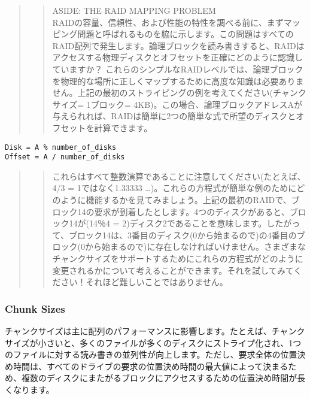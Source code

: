 \begin{quote}
\begin{quote}
ASIDE: THE RAID MAPPING PROBLEM\\
RAIDの容量、信頼性、および性能の特性を調べる前に、まずマッピング問題と呼ばれるものを脇に示します。この問題はすべてのRAID配列で発生します。論理ブロックを読み書きすると、RAIDはアクセスする物理ディスクとオフセットを正確にどのように認識していますか？
これらのシンプルなRAIDレベルでは、論理ブロックを物理的な場所に正しくマップするために高度な知識は必要ありません。上記の最初のストライピングの例を考えてください(チャンクサイズ=
1ブロック=
4KB)。この場合、論理ブロックアドレスAが与えられれば、RAIDは簡単に2つの簡単な式で所望のディスクとオフセットを計算できます。
\end{quote}
\end{quote}

\begin{verbatim}
Disk = A % number_of_disks
Offset = A / number_of_disks
\end{verbatim}

\begin{quote}
\begin{quote}
これらはすべて整数演算であることに注意してください(たとえば、4/3 =
1ではなく1.33333
\ldots)。これらの方程式が簡単な例のためにどのように機能するかを見てみましょう。上記の最初のRAIDで、ブロック14の要求が到着したとします。4つのディスクがあると、ブロック14が(14％4
=
2)ディスク2であることを意味します。したがって、ブロック14は、3番目のディスク(0から始まるので)の4番目のブロック(0から始まるので)に存在しなければいけません。さまざまなチャンクサイズをサポートするためにこれらの方程式がどのように変更されるかについて考えることができます。それを試してみてください！それほど難しいことではありません。
\end{quote}
\end{quote}

\hypertarget{chunk-sizes}{%
\subsubsection*{Chunk Sizes}\label{chunk-sizes}}

チャンクサイズは主に配列のパフォーマンスに影響します。たとえば、チャンクサイズが小さいと、多くのファイルが多くのディスクにストライプ化され、1つのファイルに対する読み書きの並列性が向上します。ただし、要求全体の位置決め時間は、すべてのドライブの要求の位置決め時間の最大値によって決まるため、複数のディスクにまたがるブロックにアクセスするための位置決め時間が長くなります。

